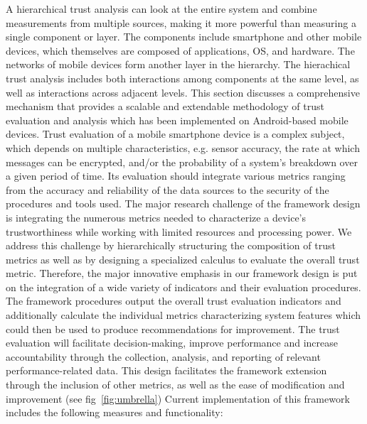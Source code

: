 A hierarchical trust analysis can look at the entire system and combine measurements from multiple sources, making
it more powerful than measuring a single component or layer.  The components include smartphone and other mobile
devices, which themselves are composed of applications, OS, and hardware. The networks of mobile devices form another layer
in the hierarchy.  The hierachical trust analysis includes both interactions among components at the same level, as well
as interactions across adjacent levels.
This section discusses a comprehensive mechanism that provides a scalable and extendable methodology of trust
 evaluation and analysis which has been implemented on Android-based mobile devices.
Trust evaluation of a mobile smartphone device is a complex subject, which depends on multiple characteristics, 
e.g. sensor accuracy, the rate at which messages can be encrypted,
 and/or the probability of a system's breakdown over a given period of time. Its evaluation should integrate various metrics ranging from the accuracy and reliability of the data sources to the security of the procedures and tools used. The major research challenge of the framework design is integrating the numerous metrics needed to characterize a device's trustworthiness while working with limited resources and processing power. 
We address this challenge by hierarchically structuring the composition of trust metrics as well as by designing a specialized calculus to evaluate the overall trust metric. 
Therefore, the major innovative emphasis in our framework design is put on the integration of a wide variety of indicators and their evaluation procedures. The framework procedures output the overall trust evaluation indicators and additionally 
calculate the individual metrics characterizing system features which could then be used to produce recommendations for improvement. 
The trust evaluation will facilitate decision-making, improve performance and increase accountability through the collection, analysis, and reporting of relevant performance-related data. This design facilitates the framework extension through
 the inclusion of other metrics, as well as the ease of modification and improvement (see fig~\ref{fig:umbrella})
Current implementation of this framework includes the following measures and functionality: 

